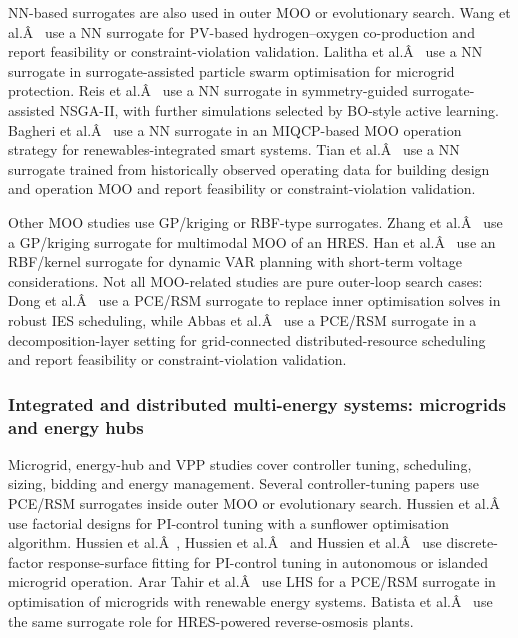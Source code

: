 NN-based surrogates are also used in outer MOO or evolutionary search.
Wang et al.Â~\cite{Wang2024} use a NN surrogate for PV-based hydrogen--oxygen
co-production and report feasibility or constraint-violation validation.
Lalitha et al.Â~\cite{Lalitha20231401} use a NN surrogate in
surrogate-assisted particle swarm optimisation for microgrid protection.
Reis et al.Â~\cite{Reis2025} use a NN surrogate in symmetry-guided
surrogate-assisted NSGA-II, with further simulations selected by
BO-style active learning. Bagheri et al.Â~\cite{bagheri_miqcp-based_2025} use
a NN surrogate in an MIQCP-based MOO operation strategy for
renewables-integrated smart systems. Tian et al.Â~\cite{tian_building_2025}
use a NN surrogate trained from historically observed operating data for
building design and operation MOO and report feasibility or
constraint-violation validation.

Other MOO studies use GP/kriging or RBF-type surrogates. Zhang et
al.Â~\cite{Zhang20234075} use a GP/kriging surrogate for multimodal MOO of an
HRES. Han et al.Â~\cite{Han2018622} use an RBF/kernel surrogate for dynamic
VAR planning with short-term voltage considerations. Not all MOO-related
studies are pure outer-loop search cases: Dong et al.Â~\cite{Dong2023__2} use
a PCE/RSM surrogate to replace inner optimisation solves in robust IES
scheduling, while Abbas et al.Â~\cite{abbas_optimal_2024} use a PCE/RSM
surrogate in a decomposition-layer setting for grid-connected
distributed-resource scheduling and report feasibility or
constraint-violation validation.

\subsubsection{Integrated and distributed multi-energy systems: microgrids and energy hubs}
\label{sec:apps:microgrid}

Microgrid, energy-hub and VPP studies cover controller tuning,
scheduling, sizing, bidding and energy management. Several
controller-tuning papers use PCE/RSM surrogates inside outer MOO or
evolutionary search. Hussien et al.Â~\cite{Hussien20211883} use factorial
designs for PI-control tuning with a sunflower optimisation algorithm.
Hussien et al.Â~\cite{Hussien20226442}, Hussien et al.Â~\cite{Hussien202190577}
and Hussien et al.Â~\cite{Hussien202415075} use discrete-factor
response-surface fitting for PI-control tuning in autonomous or islanded
microgrid operation. Arar Tahir et al.Â~\cite{arar_tahir_scientific_2023} use
LHS for a PCE/RSM surrogate in optimisation of microgrids with renewable
energy systems. Batista et al.Â~\cite{batista_optimizing_2023} use the same
surrogate role for HRES-powered reverse-osmosis plants.

